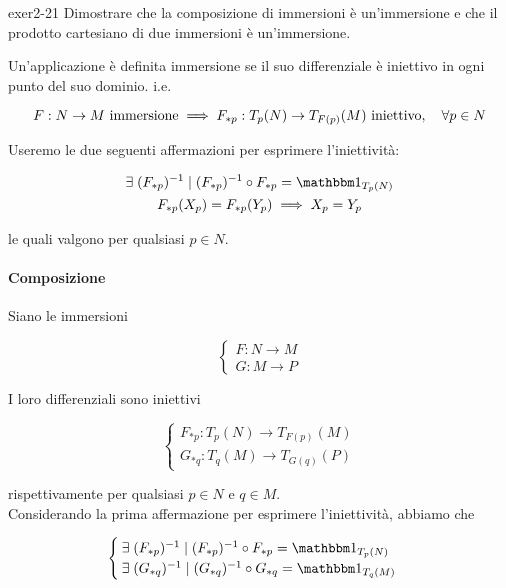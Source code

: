 {exer2-21}
{
Dimostrare che la composizione di immersioni è un’immersione e che il prodotto cartesiano di due immersioni è un’immersione.
}
{
Un'applicazione è definita immersione se il suo differenziale è iniettivo in ogni punto del suo dominio. i.e.

\begin{equation}
	F : N \to M \text{ immersione} %
	\implies %
	F_{*p} : T_{p}(N) \to T_{F(p)}(M) \text{ iniettivo} \qcomma \forall p \in N
\end{equation}

Useremo le due seguenti affermazioni per esprimere l'iniettività:

\begin{gather}
	\E (F_{*p})^{-1} \mid (F_{*p})^{-1} \circ F_{*p} = \bigone_{T_{p}(N)} \\
	F_{*p}(X_{p}) = F_{*p}(Y_{p}) \implies X_{p} = Y_{p}
\end{gather}

le quali valgono per qualsiasi $ p \in N $.

\paragraph{Composizione}

Siano le immersioni

\begin{equation}
	\begin{cases}
		F : N \to M \\
		G : M \to P
	\end{cases}
\end{equation}

I loro differenziali sono iniettivi

\begin{equation}
	\begin{cases}
		F_{*p} : T_{p}(N) \to T_{F(p)}(M) \\
		G_{*q} : T_{q}(M) \to T_{G(q)}(P)
	\end{cases}
\end{equation}

rispettivamente per qualsiasi $ p \in N $ e $ q \in M $. \\
Considerando la prima affermazione per esprimere l'iniettività, abbiamo che

\begin{equation}
	\begin{cases}
		\E (F_{*p})^{-1} \mid (F_{*p})^{-1} \circ F_{*p} = \bigone_{T_{p}(N)} \\
		\E (G_{*q})^{-1} \mid (G_{*q})^{-1} \circ G_{*q} = \bigone_{T_{q}(M)}
	\end{cases}
\end{equation}

}
